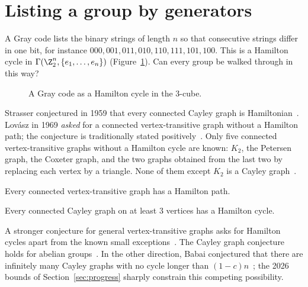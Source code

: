 \section{Listing a group by generators}\label{sec:hamilton}

A Gray code lists the binary strings of length $n$ so that consecutive strings differ in one bit, for instance $000,001,011,010,110,111,101,100$. This is a Hamilton cycle in $\Gamma(\Z_2^n,\{e_1,\dots,e_n\})$ (Figure~\ref{fig:gray-code}). Can every group be walked through in this way?

\begin{figure}[ht]
\centering

\caption{A Gray code as a Hamilton cycle in the $3$-cube.}
\label{fig:gray-code}
\end{figure}

Strasser conjectured in 1959 that every connected Cayley graph is Hamiltonian~\cite[Conjecture~1.7]{dmmps24}. Lov\'asz in 1969 \emph{asked} for a connected vertex-transitive graph without a Hamilton path; the conjecture is traditionally stated positively~\cite[\S1]{chm14}. Only five connected vertex-transitive graphs without a Hamilton cycle are known: $K_2$, the Petersen graph, the Coxeter graph, and the two graphs obtained from the last two by replacing each vertex by a triangle. None of them except $K_2$ is a Cayley graph~\cite[\S1]{chm14}.

\begin{conjecture}\label{conj:lovasz}
Every connected vertex-transitive graph has a Hamilton path.
\end{conjecture}

\begin{conjecture}\label{conj:strasser}
Every connected Cayley graph on at least $3$ vertices has a Hamilton cycle.
\end{conjecture}

A stronger conjecture for general vertex-transitive graphs asks for Hamilton cycles apart from the known small exceptions~\cite[Conjecture~1.6]{dmmps24}. The Cayley graph conjecture holds for abelian groups~\cite[\S1.1]{dmmps24}. In the other direction, Babai conjectured that there are infinitely many Cayley graphs with no cycle longer than $(1-c)n$~\cite[\S1]{chm14}; the 2026 bounds of Section~\ref{sec:progress} sharply constrain this competing possibility.

